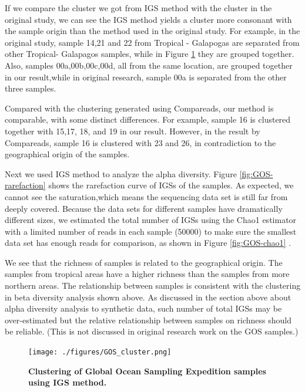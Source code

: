 If we compare the cluster we got from IGS method with the cluster in the original 
study, we can see the IGS method yields a
cluster more consonant with the sample origin
than the method used in the original 
study. For example, in the original study,
sample 14,21 and 22 from Tropical - Galapogas are separated from other 
Tropical- Galapagos samples, while in Figure \ref{fig:GOS-beta} 
they are grouped together. Also, samples 00a,00b,00c,00d, all from the 
same location, are grouped together in our result,while
in original research, sample 00a is separated from the other three samples.


Compared with the clustering generated using Compareads, our method is comparable, with some 
distinct differences. For example, sample 16 is clustered together with 15,17,
18, and 19 in our result. However, in the result by Compareads, sample 16 is clustered 
with 23 and 26, in contradiction to the geographical origin of the samples.

Next we used IGS method to analyze the alpha diversity.
Figure \ref{fig:GOS-rarefaction} shows the rarefaction curve of IGSs of the samples.
As expected, we cannot see the saturation,which means the sequencing data 
set is still far from deeply covered.
Because the data sets for different samples have dramatically different sizes, 
we estimated the total number of IGSs using the Chao1 estimator with a limited 
number of reads in each sample (50000) to make sure the smallest data set 
has enough reads for comparison, as shown in Figure \ref{fig:GOS-chao1} .

We see that the richness of samples is related to the geographical 
origin. The samples from tropical areas have a higher richness than
the samples from more northern areas. The relationship between samples is 
consistent with the clustering in beta diversity analysis shown above.
As discussed in the section above about alpha diversity analysis 
to synthetic data, such number of total IGSs may be over-estimated but
the relative relationship between samples on richness should be reliable.
(This is not discussed in original research work on the GOS samples.)

\begin{figure}[!ht]
 \centerline{\texttt{[image: ./figures/GOS\_cluster.png]}}
\caption{\bf Clustering of Global Ocean Sampling Expedition samples using IGS
method.}
\label{fig:GOS-beta}
\end{figure}

